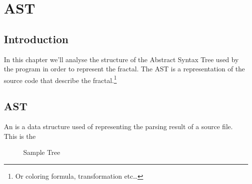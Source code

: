 \chapter{AST}

\section{Introduction}

In this chapter we'll analyse the structure of the Abstract Syntax Tree used by the program in order to represent the fractal. The AST is a representation of the source code that describe the fractal.\footnote{Or coloring formula, transformation etc\ldots{}}

\section{AST}

An  is a data structure used of representing the parsing result of a source file. This is the
\begin{figure}
\centering

\label{fig:treesample}
\caption{Sample Tree}
\end{figure}






